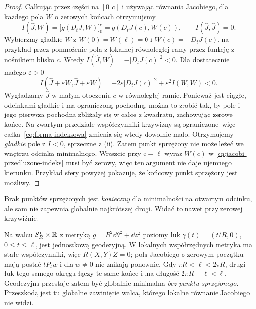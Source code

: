 \begin{proof}
Całkując przez części na $[0,c]$ i używając
równania Jacobiego, dla każdego pola $W$
o zerowych końcach otrzymujemy
\begin{equation}\label{eq:jacobi-przedluzone-indeks}
 I(\widehat J,W)
 =\bigl[g(D_tJ,W)\bigr]_0^c
 =g(D_tJ(c),W(c)),
 \qquad I(\widehat J,\widehat J)=0.
\end{equation}
Wybierzmy gładkie $W$ z $W(0)=W(\ell)=0$
i $W(c)=-D_tJ(c)$, na przykład przez
pomnożenie pola z lokalnej równoległej ramy
przez funkcję z nośnikiem blisko $c$.
Wtedy $I(\widehat J,W)=-|D_tJ(c)|^2<0$.
Dla dostatecznie małego $\varepsilon>0$
\[
 I(\widehat J+\varepsilon W,
   \widehat J+\varepsilon W)
 =-2\varepsilon|D_tJ(c)|^2
       +\varepsilon^2 I(W,W)<0.
\]
Wygładzamy $\widehat J$ w małym otoczeniu $c$
w równoległej ramie. Ponieważ jest ciągłe,
odcinkami gładkie i ma ograniczoną pochodną,
można to zrobić tak, by pole i jego pierwsza
pochodna zbliżały się w całce z kwadratu,
zachowując zerowe końce. Na zwartym przedziale
współczynniki krzywizny są ograniczone,
więc całka~\eqref{eq:forma-indeksowa}
zmienia się wtedy dowolnie mało. Otrzymujemy
\emph{gładkie} pole z $I<0$, sprzeczne z (ii).
Zatem punkt sprzężony nie może leżeć
we wnętrzu odcinka minimalnego.
Wreszcie przy $c=\ell$ wyraz $W(c)$ w
\eqref{eq:jacobi-przedluzone-indeks} musi
być zerowy, więc ten argument nie daje
ujemnego kierunku. Przykład sfery powyżej
pokazuje, że końcowy punkt sprzężony jest
możliwy.
\end{proof}

Brak punktów sprzężonych jest \emph{konieczny}
dla minimalności na otwartym odcinku,
ale sam nie zapewnia globalnie najkrótszej drogi.
Widać to nawet przy zerowej krzywiźnie.

\begin{przyklad}
\label{prz:jacobi-plaski-walec}
Na walcu $S_R^1\times\mathbb{R}$ z metryką
$g=R^2\dd\theta^2+\dd z^2$ poziomy łuk
$\gamma(t)=(t/R,0)$, $0\leq t\leq\ell$,
jest jednostkową geodezyjną. W lokalnych
współrzędnych metryka ma stałe współczynniki,
więc $R(X,Y)Z=0$; pola Jacobiego o zerowym
początku mają postać $tP_tw$ i dla $w\ne0$ nie znikają
ponownie. Gdy $\pi R<\ell<2\pi R$, drugi
łuk tego samego okręgu łączy te same końce
i ma długość $2\pi R-\ell<\ell$.
Geodezyjna przestaje zatem być globalnie
minimalna \emph{bez punktu sprzężonego}.
Przeszkodą jest tu globalne zawinięcie walca,
którego lokalne równanie Jacobiego nie widzi.
\end{przyklad}

